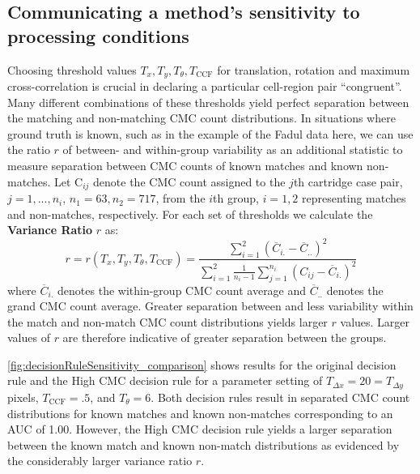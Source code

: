 \hypertarget{communicating-a-methods-sensitivity-to-processing-conditions}{%
\subsection{Communicating a method's sensitivity to processing
conditions}\label{communicating-a-methods-sensitivity-to-processing-conditions}}

Choosing threshold values \(T_x, T_y, T_\theta, T_{\text{CCF}}\) for
translation, rotation and maximum cross-correlation is crucial in
declaring a particular cell-region pair ``congruent''. Many different
combinations of these thresholds yield perfect separation between the
matching and non-matching CMC count distributions. In situations where
ground truth is known, such as in the example of the Fadul data here, we
can use the ratio \(r\) of between- and within-group variability as an
additional statistic to measure separation between CMC counts of known
matches and known non-matches. Let C\(_{ij}\) denote the CMC count
assigned to the \(j\)th cartridge case pair, \(j = 1,...,n_i\),
\(n_1 = 63, n_2 = 717\), from the \(i\)th group, \(i = 1,2\)
representing matches and non-matches, respectively. For each set of
thresholds we calculate the \textbf{Variance Ratio} \(r\) as: \[
r = r\left(T_x, T_y, T_\theta, T_{\text{CCF}}\right) = \frac{\sum_{i=1}^2 \left(\overline{C}_{i.} - \overline{C}_{..}\right)^2}{\sum_{i=1}^2 \frac{1}{n_i - 1}\sum_{j=1}^{n_i} \left(C_{ij} - \overline{C}_{i.}\right)^2}
\] where \(\overline{C}_{i.}\) denotes the within-group CMC count
average and \(\overline{C}_{..}\) denotes the grand CMC count average.
Greater separation between and less variability within the match and
non-match CMC count distributions yields larger \(r\) values. Larger
values of \(r\) are therefore indicative of greater separation between
the groups.

\autoref{fig:decisionRuleSensitivity_comparison} shows results for the
original decision rule and the High CMC decision rule for a parameter
setting of \(T_{\Delta x} = 20 = T_{\Delta y}\) pixels,
\(T_{\text{CCF}} = .5\), and \(T_{\theta} = 6\). Both decision rules
result in separated CMC count distributions for known matches and known
non-matches corresponding to an AUC of 1.00. However, the High CMC
decision rule yields a larger separation between the known match and
known non-match distributions as evidenced by the considerably larger
variance ratio \(r\).

